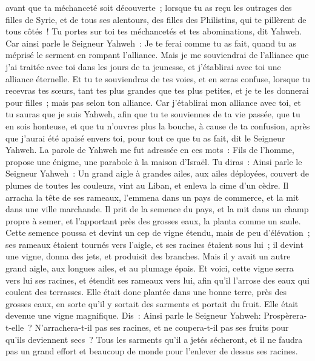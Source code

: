\begin{multicols}{2}
avant que ta méchanceté soit découverte~; lorsque tu as reçu les outrages des filles de Syrie, et de tous ses alentours, des filles des Philistins, qui te pillèrent de tous côtés~!
Tu portes sur toi tes méchancetés et tes abominations, dit Yahweh.
Car ainsi parle le Seigneur Yahweh~: Je te ferai comme tu as fait, quand tu as méprisé le serment en rompant l'alliance.
Mais je me souviendrai de l'alliance que j'ai traitée avec toi dans les jours de ta jeunesse, et j'établirai avec toi une alliance éternelle.
Et tu te souviendras de tes voies, et en seras confuse, lorsque tu recevras tes sœurs, tant tes plus grandes que tes plus petites, et je te les donnerai pour filles~; mais pas selon ton alliance.
Car j'établirai mon alliance avec toi, et tu sauras que je suis Yahweh,
afin que tu te souviennes de ta vie passée, que tu en sois honteuse, et que tu n'ouvres plus la bouche, à cause de ta confusion, après que j'aurai été apaisé envers toi, pour tout ce que tu as fait, dit le Seigneur Yahweh.
\VerseOne{}La parole de Yahweh me fut adressée en ces mots~:
Fils de l'homme, propose une énigme, une parabole à la maison d'Israël.
Tu diras~: Ainsi parle le Seigneur Yahweh~: Un grand aigle à grandes ailes, aux ailes déployées, couvert de plumes de toutes les couleurs, vint au Liban, et enleva la cime d'un cèdre.
Il arracha la tête de ses rameaux, l'emmena dans un pays de commerce, et la mit dans une ville marchande.
Il prit de la semence du pays, et la mit dans un champ propre à semer, et l'apportant près des grosses eaux, la planta comme un saule.
Cette semence poussa et devint un cep de vigne étendu, mais de peu d'élévation~; ses rameaux étaient tournés vers l'aigle, et ses racines étaient sous lui~; il devint une vigne, donna des jets, et produisit des branches.
Mais il y avait un autre grand aigle, aux longues ailes, et au plumage épais. Et voici, cette vigne serra vers lui ses racines, et étendit ses rameaux vers lui, afin qu'il l'arrose des eaux qui coulent des terrasses.
Elle était donc plantée dans une bonne terre, près des grosses eaux, en sorte qu'il y sortait des sarments et portait du fruit. Elle était devenue une vigne magnifique.
Dis~: Ainsi parle le Seigneur Yahweh: Prospèrera-t-elle~? N'arrachera-t-il pas ses racines, et ne coupera-t-il pas ses fruits pour qu'ils deviennent secs~? Tous les sarments qu'il a jetés sécheront, et il ne faudra pas un grand effort et beaucoup de monde pour l'enlever de dessus ses racines.

\end{multicols}
